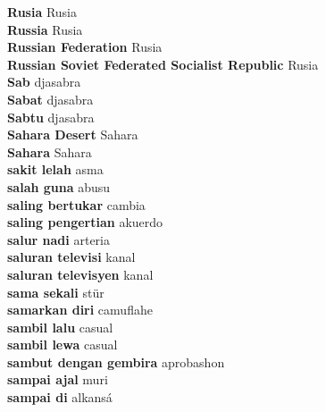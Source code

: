 \textbf{ Rusia  } Rusia \\
\textbf{ Russia  } Rusia \\
\textbf{ Russian Federation  } Rusia \\
\textbf{ Russian Soviet Federated Socialist Republic  } Rusia \\
\textbf{ Sab  } djasabra \\
\textbf{ Sabat  } djasabra \\
\textbf{ Sabtu  } djasabra \\
\textbf{ Sahara Desert  } Sahara \\
\textbf{ Sahara  } Sahara \\
\textbf{ sakit lelah  } asma \\
\textbf{ salah guna  } abusu \\
\textbf{ saling bertukar  } cambia \\
\textbf{ saling pengertian  } akuerdo \\
\textbf{ salur nadi  } arteria \\
\textbf{ saluran televisi  } kanal \\
\textbf{ saluran televisyen  } kanal \\
\textbf{ sama sekali  } stür \\
\textbf{ samarkan diri  } camuflahe \\
\textbf{ sambil lalu  } casual \\
\textbf{ sambil lewa  } casual \\
\textbf{ sambut dengan gembira  } aprobashon \\
\textbf{ sampai ajal  } muri \\
\textbf{ sampai di  } alkansá \\
